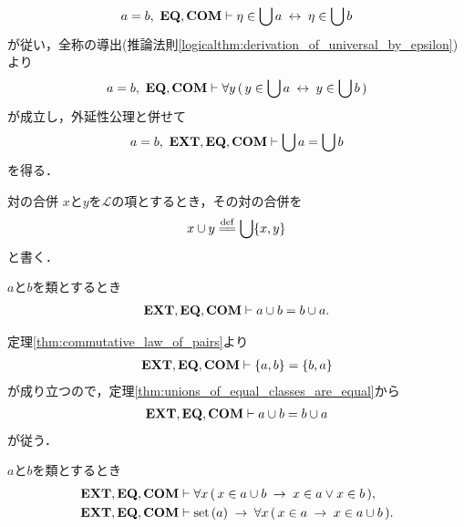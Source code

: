 \begin{sketch}
		\begin{align}
			a = b,\ \mbox{{\bf EQ}},\mbox{\bf COM} \vdash 
			\eta \in \bigcup a \hspace{0.25em}\leftrightarrow\hspace{0.25em} \eta \in \bigcup b
		\end{align}
		が従い，全称の導出(推論法則\ref{logicalthm:derivation_of_universal_by_epsilon})より
		\begin{align}
			a = b,\ \mbox{{\bf EQ}},\mbox{\bf COM} \vdash 
			\forall y\, (\, y \in \bigcup a \hspace{0.25em}\leftrightarrow\hspace{0.25em} y \in \bigcup b\, )
		\end{align}
		が成立し，外延性公理と併せて
		\begin{align}
			a = b,\ \mbox{{\bf EXT}},\mbox{{\bf EQ}},\mbox{\bf COM} \vdash 
			\bigcup a = \bigcup b
		\end{align}
		を得る．
		\QED
	\end{sketch}
	
	\begin{itembox}[l]{対の合併}
		$x$と$y$を$\mathcal{L}$の項とするとき，その対の合併を
		\begin{align}
			x \cup y \defeq \bigcup \{x,y\}
		\end{align}
		と書く．
	\end{itembox}
	
	\begin{screen}
		\begin{thm}[対の合併の対称性]
		\label{thm:symmetry_of_union_of_a_pair}
			$a$と$b$を類とするとき
			\begin{align}
				\mbox{{\bf EXT}},\mbox{{\bf EQ}},\mbox{\bf COM} \vdash a \cup b = b \cup a.
			\end{align}
		\end{thm}
	\end{screen}
	
	\begin{sketch}
		定理\ref{thm:commutative_law_of_pairs}より
		\begin{align}
			\mbox{{\bf EXT}},\mbox{{\bf EQ}},\mbox{\bf COM} \vdash \{a,b\} = \{b,a\}
		\end{align}
		が成り立つので，定理\ref{thm:unions_of_equal_classes_are_equal}から
		\begin{align}
			\mbox{{\bf EXT}},\mbox{{\bf EQ}},\mbox{\bf COM} \vdash a \cup b = b \cup a
		\end{align}
		が従う．
		\QED
	\end{sketch}
	
	\begin{screen}
		\begin{thm}[二つの集合の合併はそれぞれの要素を合わせたもの]
		\label{thm:union_of_pair_is_union_of_their_elements}
			$a$と$b$を類とするとき
			\begin{align}
				\mbox{{\bf EXT}},\mbox{{\bf EQ}},\mbox{\bf COM} &\vdash 
				\forall x\, (\, x \in a \cup b \hspace{0.25em}\rightarrow\hspace{0.25em} x \in a \vee x \in b\, ), \\
				\mbox{{\bf EXT}},\mbox{{\bf EQ}},\mbox{\bf COM} &\vdash 
				\operatorname*{set}\hspace{0.15em}(a) \hspace{0.25em}\rightarrow\hspace{0.25em} \forall x\, (\, x \in a \hspace{0.25em}\rightarrow\hspace{0.25em} x \in a \cup b\, ).
			\end{align}
		\end{thm}
	\end{screen}
	
